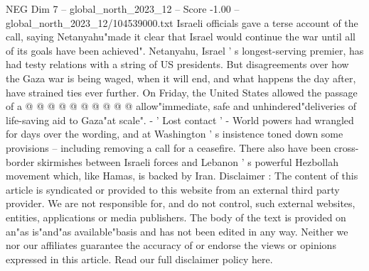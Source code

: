 \begin{textsample}{NEG Dim 7 – global\_north\_2023\_12 – Score -1.00 – global\_north\_2023\_12/104539000.txt}
Israeli officials gave a terse account of the call, saying Netanyahu"made it clear that Israel would continue the war until all of its goals have been achieved".
Netanyahu, Israel ' s longest-serving premier, has had testy relations with a string of US presidents.
But disagreements over how the Gaza war is being waged, when it will end, and what happens the day after, have strained ties ever further.
On Friday, the United States allowed the passage of a @ @ @ @ @ @ @ @ @ @ allow"immediate, safe and unhindered"deliveries of life-saving aid to Gaza"at scale". - ' Lost contact ' - World powers had wrangled for days over the wording, and at Washington ' s insistence toned down some provisions -- including removing a call for a ceasefire.
There also have been cross-border skirmishes between Israeli forces and Lebanon ' s powerful Hezbollah movement which, like Hamas, is backed by Iran.
Disclaimer : The content of this article is syndicated or provided to this website from an external third party provider.
We are not responsible for, and do not control, such external websites, entities, applications or media publishers.
The body of the text is provided on an"as is"and"as available"basis and has not been edited in any way.
Neither we nor our affiliates guarantee the accuracy of or endorse the views or opinions expressed in this article.
Read our full disclaimer policy here.

\end{textsample}
